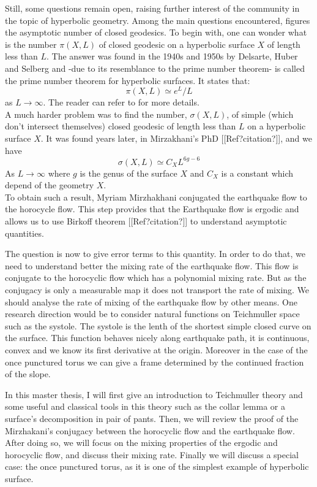 \vspace{10 px}

Still, some questions remain open, raising further interest of the community in the topic of hyperbolic geometry.
Among the main questions encountered, figures the asymptotic number of closed geodesics. To begin with, one can wonder what is the number $\pi(X,L)$ of closed geodesic on a hyperbolic surface $X$ of length less than $L$. The answer was found in the 1940s and 1950s by Delsarte, Huber and Selberg and -due to its resemblance to the prime number theorem- is called the prime number theorem for hyperbolic surfaces. It states that:\[
\pi(X,L) \simeq e^{L} / L
\]
as $L \to \infty$. The reader can refer to \cite{buser2010geometry} for more details.\\

A much harder problem was to find the number, $\sigma(X,L)$, of simple (which don't intersect themselves) closed geodesic of length less than $L$ on a hyperbolic surface $X$. It was found years later, in Mirzakhani's PhD [[Ref?citation?]], and we have \[
\sigma(X,L) \simeq C_{X}L^{6g-6}
\]
As $L \to \infty$ where $g$ is the genus of the surface $X$ and $C_{X}$ is a constant which depend of the geometry $X$.\\
To obtain such a result, Myriam Mirzhakhani conjugated the earthquake flow to the horocycle flow. This step provides that the Earthquake flow is ergodic and allows us to use Birkoff theorem [[Ref?citation?]] to understand asymptotic quantities.

\vspace{10 px}

The question is now to give error terms to this quantity. In order to do that, we need to understand better the mixing rate of the earthquake flow. This flow is conjugate to the horocyclic flow which has a polynomial mixing rate. But as the conjugacy is only a measurable map it does not transport the rate of mixing. We should analyse the rate of mixing of the earthquake flow by other means. One research direction would be to consider natural functions on Teichmuller space such as the systole. The systole is the lenth of the shortest simple closed curve on the surface. This function behaves nicely along earthquake path, it is continuous, convex and we know its first derivative at the origin. Moreover in the case of the once punctured torus we can give a frame determined by the continued fraction of the slope.

\vspace{10 px}

In this master thesis, I will first give an introduction to Teichmuller theory and some useful and classical tools in this theory such as the collar lemma or a surface's decomposition in pair of pants. Then, we will review the proof of the Mirzhakani's conjugacy between the horocyclic flow and the earthquake flow. After doing so, we will focus on the mixing properties of the ergodic and horocyclic flow, and discuss their mixing rate. Finally we will discuss a special case: the once punctured torus, as it is one of the simplest example of hyperbolic surface.
